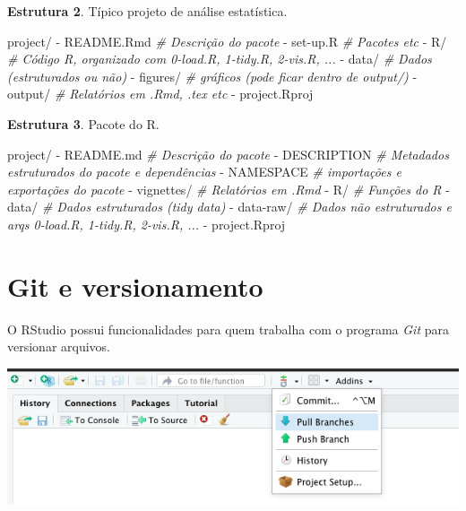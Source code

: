 \documentclass[
]{book}
\newenvironment{Shaded}{\begin{snugshade}}{\end{snugshade}}
\newcommand{\CommentTok}[1]{\textcolor[rgb]{0.56,0.35,0.01}{\textit{#1}}}
\newcommand{\ExtensionTok}[1]{#1}
\newcommand{\NormalTok}[1]{#1}
\begin{document}
\textbf{Estrutura 2}. Típico projeto de análise estatística.

\begin{Shaded}
\begin{Highlighting}[]
\ExtensionTok{project/}
  \ExtensionTok{{-}}\NormalTok{ README.Rmd   }\CommentTok{\# Descrição do pacote}
  \ExtensionTok{{-}}\NormalTok{ set{-}up.R     }\CommentTok{\# Pacotes etc}
  \ExtensionTok{{-}}\NormalTok{ R/           }\CommentTok{\# Código R, organizado com 0{-}load.R, 1{-}tidy.R, 2{-}vis.R, ...}
  \ExtensionTok{{-}}\NormalTok{ data/        }\CommentTok{\# Dados (estruturados ou não)}
  \ExtensionTok{{-}}\NormalTok{ figures/     }\CommentTok{\# gráficos (pode ficar dentro de output/)}
  \ExtensionTok{{-}}\NormalTok{ output/      }\CommentTok{\# Relatórios em .Rmd, .tex etc}
  \ExtensionTok{{-}}\NormalTok{ project.Rproj}
\end{Highlighting}
\end{Shaded}

\textbf{Estrutura 3}. Pacote do R.

\begin{Shaded}
\begin{Highlighting}[]
\ExtensionTok{project/}
  \ExtensionTok{{-}}\NormalTok{ README.md    }\CommentTok{\# Descrição do pacote}
  \ExtensionTok{{-}}\NormalTok{ DESCRIPTION  }\CommentTok{\# Metadados estruturados do pacote e dependências}
  \ExtensionTok{{-}}\NormalTok{ NAMESPACE    }\CommentTok{\# importações e exportações do pacote}
  \ExtensionTok{{-}}\NormalTok{ vignettes/   }\CommentTok{\# Relatórios em .Rmd}
  \ExtensionTok{{-}}\NormalTok{ R/           }\CommentTok{\# Funções do R}
  \ExtensionTok{{-}}\NormalTok{ data/        }\CommentTok{\# Dados estruturados (tidy data)}
  \ExtensionTok{{-}}\NormalTok{ data{-}raw/    }\CommentTok{\# Dados não estruturados e arqs 0{-}load.R, 1{-}tidy.R, 2{-}vis.R, ...}
  \ExtensionTok{{-}}\NormalTok{ project.Rproj}
\end{Highlighting}
\end{Shaded}

\hypertarget{git-e-versionamento}{%
\section{Git e versionamento}\label{git-e-versionamento}}

O RStudio possui funcionalidades para quem trabalha com o programa \emph{Git} para versionar arquivos.

\begin{center}\includegraphics[width=0.7\linewidth]{assets/img/rstudio/git-menu} \end{center}
\end{document}
